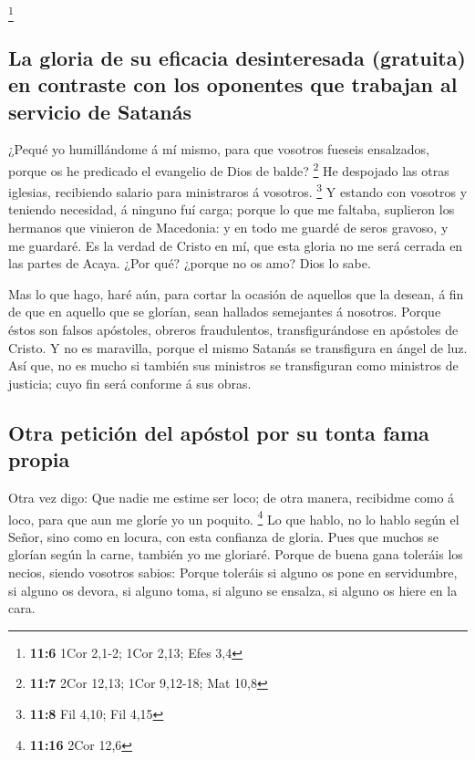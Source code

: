 \footnote{\textbf{11:6} 1Cor 2,1-2; 1Cor 2,13; Efes 3,4}

\hypertarget{la-gloria-de-su-eficacia-desinteresada-gratuita-en-contraste-con-los-oponentes-que-trabajan-al-servicio-de-satanuxe1s}{%
\subsection{La gloria de su eficacia desinteresada (gratuita) en
contraste con los oponentes que trabajan al servicio de
Satanás}\label{la-gloria-de-su-eficacia-desinteresada-gratuita-en-contraste-con-los-oponentes-que-trabajan-al-servicio-de-satanuxe1s}}

 ¿Pequé yo humillándome á mí mismo, para que vosotros
fueseis ensalzados, porque os he predicado el evangelio de Dios de
balde? \footnote{\textbf{11:7} 2Cor 12,13; 1Cor 9,12-18; Mat 10,8}
 He despojado las otras iglesias, recibiendo salario para
ministraros á vosotros. \footnote{\textbf{11:8} Fil 4,10; Fil 4,15}
 Y estando con vosotros y teniendo necesidad, á ninguno fuí
carga; porque lo que me faltaba, suplieron los hermanos que vinieron de
Macedonia: y en todo me guardé de seros gravoso, y me guardaré.
 Es la verdad de Cristo en mí, que esta gloria no me será
cerrada en las partes de Acaya.  ¿Por qué? ¿porque no os
amo? Dios lo sabe.

 Mas lo que hago, haré aún, para cortar la ocasión de
aquellos que la desean, á fin de que en aquello que se glorían, sean
hallados semejantes á nosotros.  Porque éstos son falsos
apóstoles, obreros fraudulentos, transfigurándose en apóstoles de
Cristo.  Y no es maravilla, porque el mismo Satanás se
transfigura en ángel de luz.  Así que, no es mucho si
también sus ministros se transfiguran como ministros de justicia; cuyo
fin será conforme á sus obras.

\hypertarget{otra-peticiuxf3n-del-apuxf3stol-por-su-tonta-fama-propia}{%
\subsection{Otra petición del apóstol por su tonta fama
propia}\label{otra-peticiuxf3n-del-apuxf3stol-por-su-tonta-fama-propia}}

 Otra vez digo: Que nadie me estime ser loco; de otra
manera, recibidme como á loco, para que aun me gloríe yo un poquito.
\footnote{\textbf{11:16} 2Cor 12,6}  Lo que hablo, no lo
hablo según el Señor, sino como en locura, con esta confianza de gloria.
 Pues que muchos se glorían según la carne, también yo me
gloriaré.  Porque de buena gana toleráis los necios, siendo
vosotros sabios:  Porque toleráis si alguno os pone en
servidumbre, si alguno os devora, si alguno toma, si alguno se ensalza,
si alguno os hiere en la cara.

